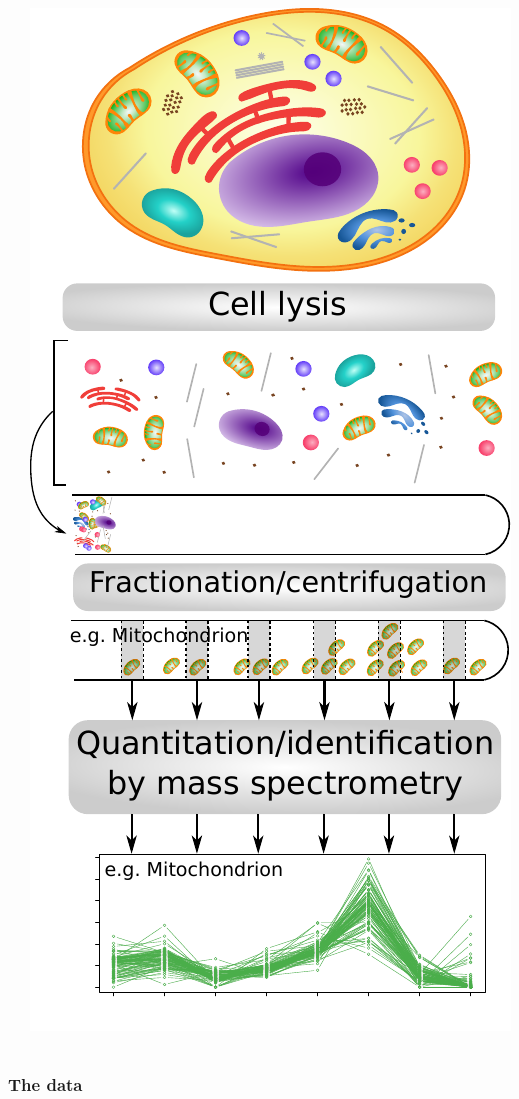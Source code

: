 \documentclass{beamer}
\theoremstyle{example}
\begin{document}
\begin{frame}{}
\begin{columns}
\begin{column}{0.5\textwidth}
      
    \end{column}
    \begin{column}{0.5\textwidth}
      \includegraphics[width=.78\linewidth]{figs/workflow_primary.pdf}
    \end{column}    
  \end{columns}
  
\end{frame}

\subsubsection*{The data}
\label{sec:data}
\end{document}
